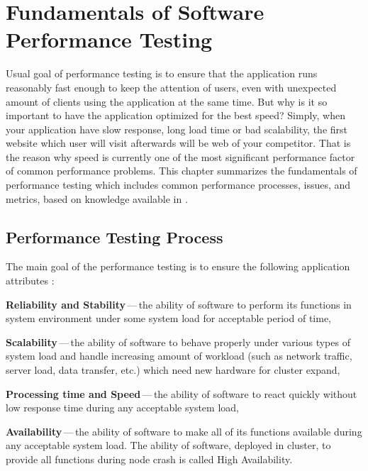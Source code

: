 
\chapter{Fundamentals of Software Performance Testing}
\label{Fundamentals of Software Performance Testing}
Usual goal of performance testing is to ensure that the application runs reasonably fast enough to keep the attention of users, even with unexpected amount of clients using the application at the same time. But why is it so important to have the application optimized for the best speed? Simply, when your application have slow response, long load time or bad scalability, the first website which user will visit afterwards will be web of your competitor. That is the reason why speed is currently one of the most significant performance factor of common performance problems. This chapter summarizes the fundamentals of performance testing which includes common performance processes, issues, and metrics, based on knowledge available in \cite{Molyneaux:TAoAPT, Kurkova:Thesis:2017, DIN:PHD, ISTQB}.


\section{Performance Testing Process}
\label{Performance Testing Process}
The main goal of the performance testing is to ensure the following application attributes \cite{GAO:MEASURING}:

\begin{description}
	\setlength\itemsep{0em}
	\item \textbf{Reliability and Stability}\,---\,the ability of software to perform its functions in system environment under some system load for acceptable\footnotemark{} period of time,
	\item \textbf{Scalability}\,---\,the ability of software to behave properly under various types of system load and handle increasing amount of workload (such as network traffic, server load, data transfer, etc.) which need new hardware for cluster expand,
	\item \textbf{Processing time and Speed}\,---\,the ability of software to react quickly without low response time during any acceptable system load,
	\item \textbf{Availability}\,---\,the ability of software to make all of its functions available during any acceptable system load. The ability of software, deployed in cluster, to provide all functions during node crash is called High Availability.
\end{description}

